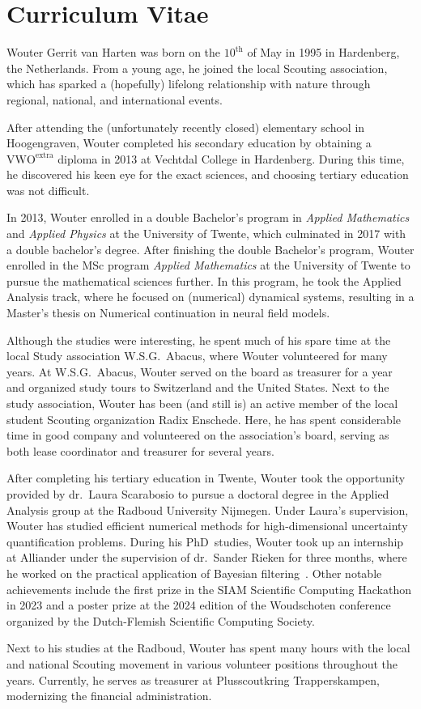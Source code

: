 \chapter*{Curriculum Vitae}
Wouter Gerrit van Harten was born on the $10^{\text{th}}$ of May in 1995 in Hardenberg, the Netherlands.
From a young age, he joined the local Scouting association, which has sparked a (hopefully) lifelong relationship with nature through regional, national, and international events.

After attending the (unfortunately recently closed) elementary school in Hoogengraven, Wouter completed his secondary education by obtaining a $\text{VWO}^{\text{extra}}$ diploma in 2013 at Vechtdal College in Hardenberg.
During this time, he discovered his keen eye for the exact sciences, and choosing tertiary education was not difficult.

In 2013, Wouter enrolled in a double Bachelor's program in \emph{Applied Mathematics} and \emph{Applied Physics} at the University of Twente, which culminated in 2017 with a double bachelor's degree.
After finishing the double Bachelor's program, Wouter enrolled in the MSc program \emph{Applied Mathematics} at the University of Twente to pursue the mathematical sciences further.
In this program, he took the Applied Analysis track, where he focused on (numerical) dynamical systems, resulting in a Master's thesis on Numerical continuation in neural field models.

Although the studies were interesting, he spent much of his spare time at the local Study association W.S.G.~Abacus, where Wouter volunteered for many years.
At W.S.G.~Abacus, Wouter served on the board as treasurer for a year and organized study tours to Switzerland and the United States.
Next to the study association, Wouter has been (and still is) an active member of the local student Scouting organization Radix Enschede.
Here, he has spent considerable time in good company and volunteered on the association's board, serving as both lease coordinator and treasurer for several years.

After completing his tertiary education in Twente, Wouter took the opportunity provided by dr.~Laura Scarabosio to pursue a doctoral degree in the Applied Analysis group at the Radboud University Nijmegen.
Under Laura's supervision, Wouter has studied efficient numerical methods for high-dimensional uncertainty quantification problems.
During his PhD~studies, Wouter took up an internship at Alliander under the supervision of dr.~Sander Rieken for three months, where he worked on the practical application of Bayesian filtering~\cite{vanharten2025}.
Other notable achievements include the first prize in the SIAM Scientific Computing Hackathon in 2023 and a poster prize at the 2024 edition of the Woudschoten conference organized by the Dutch-Flemish Scientific Computing Society.

Next to his studies at the Radboud, Wouter has spent many hours with the local and national Scouting movement in various volunteer positions throughout the years.
Currently, he serves as treasurer at Plusscoutkring Trapperskampen, modernizing the financial administration.